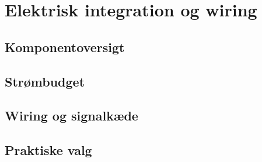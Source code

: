 \chapter{Elektrisk integration og wiring}
\label{ch:el}


\section{Komponentoversigt}

\section{Strømbudget}

\section{Wiring og signalkæde}

\section{Praktiske valg}
